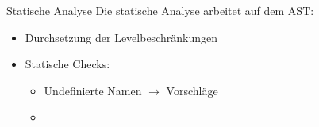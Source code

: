 \begin{frame}{Statische Analyse}
	Die statische Analyse arbeitet auf dem AST:
	\begin{itemize}
		\item Durchsetzung der Levelbeschränkungen
		\item Statische Checks:
		\begin{itemize}
			\item Undefinierte Namen $\rightarrow$ Vorschläge
			\item 
		\end{itemize}
	\end{itemize}
\end{frame}